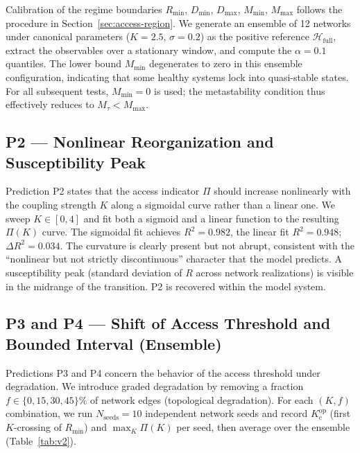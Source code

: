 ﻿\documentclass[11pt,a4paper]{article}
\theoremstyle{plain}
\theoremstyle{definition}
\theoremstyle{remark}
\begin{document}
Calibration of the regime boundaries $R_{\min}$, $D_{\min}$, $D_{\max}$, $M_{\min}$, $M_{\max}$ follows the procedure in Section~\ref{sec:access-region}. We generate an ensemble of 12 networks under canonical parameters ($K = 2.5$, $\sigma = 0.2$) as the positive reference $\mathcal{H}_{\mathrm{full}}$, extract the observables over a stationary window, and compute the $\alpha = 0.1$ quantiles. The lower bound $M_{\min}$ degenerates to zero in this ensemble configuration, indicating that some healthy systems lock into quasi-stable states. For all subsequent tests, $M_{\min} = 0$ is used; the metastability condition thus effectively reduces to $M_\tau < M_{\max}$.

\subsection{P2 --- Nonlinear Reorganization and Susceptibility Peak}

Prediction P2 states that the access indicator $\Pi$ should increase nonlinearly with the coupling strength $K$ along a sigmoidal curve rather than a linear one. We sweep $K \in [0, 4]$ and fit both a sigmoid and a linear function to the resulting $\Pi(K)$ curve. The sigmoidal fit achieves $R^2 = 0.982$, the linear fit $R^2 = 0.948$; $\Delta R^2 = 0.034$. The curvature is clearly present but not abrupt, consistent with the ``nonlinear but not strictly discontinuous'' character that the model predicts. A susceptibility peak (standard deviation of $R$ across network realizations) is visible in the midrange of the transition. P2 is recovered within the model system.

\subsection{P3 and P4 --- Shift of Access Threshold and Bounded Interval (Ensemble)}

Predictions P3 and P4 concern the behavior of the access threshold under degradation. We introduce graded degradation by removing a fraction $f \in \{0, 15, 30, 45\}\%$ of network edges (topological degradation). For each $(K, f)$ combination, we run $N_{\mathrm{seeds}} = 10$ independent network seeds and record $K_c^{\mathrm{op}}$ (first $K$-crossing of $R_{\min}$) and $\max_K \Pi(K)$ per seed, then average over the ensemble (Table~\ref{tab:v2}).
\end{document}
